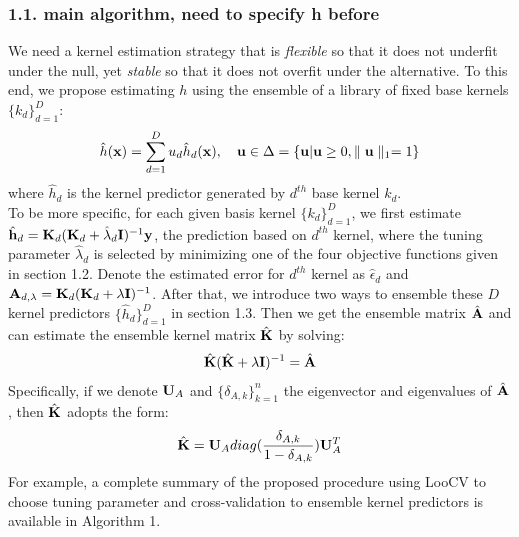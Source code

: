 \documentclass[11pt]{article}
\begin{document}
\subsubsection*{{1.1. main algorithm, need to specify h before}}
We need a kernel estimation strategy that is \textsl{flexible} so that it does not underfit under the null, yet \textsl{stable} so that it does not overfit under the alternative. To this end, we propose estimating $h$ using the ensemble of a library of fixed base kernels $\{k_d\}_{d=1}^D$:
\begin{align}
\hat{h}({\bf x})=\sum_{d=1}^D u_d\hat{h}_d({\bf x}), \quad {\bf u} \in \Delta=\{{\bf u} | {\bf u} \geq 0, \parallel {\bf u} \parallel_1=1\}
\end{align}
where $\hat{h}_d$ is the kernel predictor generated by $d^{th}$ base kernel $k_d$.\\
To be more specific, for each given basis kernel $\{k_d\}_{d=1}^D$, we first estimate $\hat{{\bf h}}_d={\bf K}_d({\bf K}_d+\hat{\lambda}_d{\bf I})^{-1}{\bf y}$, the prediction based on $d^{th}$ kernel, where the tuning parameter $\hat{\lambda}_d$ is selected by minimizing one of the four objective functions given in section 1.2. Denote the estimated error for $d^{th}$ kernel as $\hat{\epsilon}_d$ and ${\bf A}_{d,\lambda}={\bf K}_d({\bf K}_d+\lambda{\bf I})^{-1}$. After that, we introduce two ways to ensemble these $D$ kernel predictors $\{\hat{h}_d\}_{d=1}^D$ in section 1.3. Then we get the ensemble matrix $\hat{{\bf A}}$ and can estimate the ensemble kernel matrix $\hat{{\bf K}}$ by solving:
\begin{align*}
\hat{{\bf K}}(\hat{{\bf K}}+\lambda {\bf I})^{-1}=\hat{{\bf A}}
\end{align*}
Specifically, if we denote ${\bf U}_A$ and $\{\delta_{A,k}\}_{k=1}^n$ the eigenvector and eigenvalues of $\hat{{\bf A}}$, then $\hat{{\bf K}}$ adopts the form:
\begin{align*}
\hat{{\bf K}}={\bf U}_A diag(\frac{\delta_{A,k}}{1-\delta_{A,k}}){\bf U}_A^T
\end{align*}
 \vspace{1em}
For example, a complete summary of the proposed procedure using LooCV to choose tuning parameter and cross-validation to ensemble kernel predictors is available in Algorithm 1.

\end{document}
